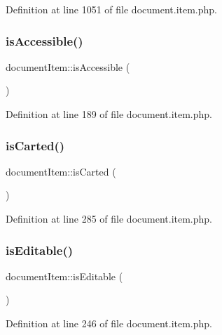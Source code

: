 Definition at line 1051 of file document.\+item.\+php.

\mbox{\label{classdocumentItem_a560fb40cd322ef5b8b3aa7d298730fcd}} 
\subsubsection{\texorpdfstring{is\+Accessible()}{isAccessible()}}
{\footnotesize\ttfamily document\+Item\+::is\+Accessible (\begin{DoxyParamCaption}{ }\end{DoxyParamCaption})}



Definition at line 189 of file document.\+item.\+php.

\mbox{\label{classdocumentItem_a505c87502da3ca4b656230125ffa4f1e}} 
\subsubsection{\texorpdfstring{is\+Carted()}{isCarted()}}
{\footnotesize\ttfamily document\+Item\+::is\+Carted (\begin{DoxyParamCaption}{ }\end{DoxyParamCaption})}



Definition at line 285 of file document.\+item.\+php.

\mbox{\label{classdocumentItem_afb7ed54e828eeae6607328e285c7a8fe}} 
\subsubsection{\texorpdfstring{is\+Editable()}{isEditable()}}
{\footnotesize\ttfamily document\+Item\+::is\+Editable (\begin{DoxyParamCaption}{ }\end{DoxyParamCaption})}



Definition at line 246 of file document.\+item.\+php.

